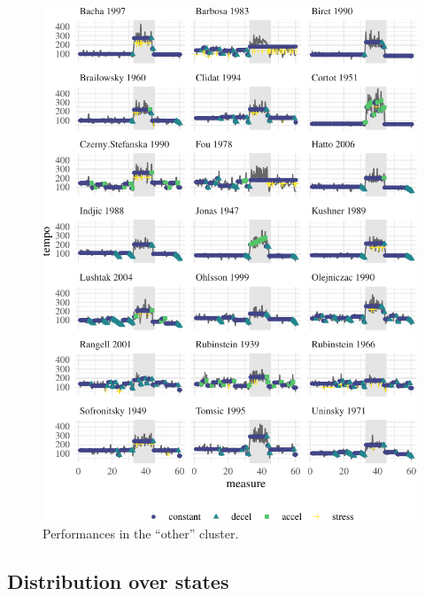 \documentclass[aoas]{aoas/imsart}
\begin{document}
\begin{figure}

{\centering \includegraphics{gfx/clust-other-1} 

}

\caption{Performances in the ``other'' cluster.}\label{fig:clust-other}
\end{figure}

\hypertarget{distribution-over-states}{%
\subsection{Distribution over states}\label{distribution-over-states}}


\clearpage



\end{document}
